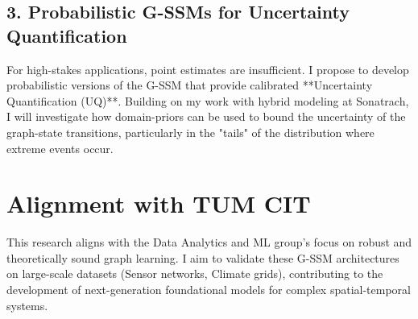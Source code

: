 \documentclass[11pt,a4paper]{article}
\begin{document}
\subsection{3. Probabilistic G-SSMs for Uncertainty Quantification}
For high-stakes applications, point estimates are insufficient. I propose to develop probabilistic versions of the G-SSM that provide calibrated **Uncertainty Quantification (UQ)**. Building on my work with hybrid modeling at Sonatrach, I will investigate how domain-priors can be used to bound the uncertainty of the graph-state transitions, particularly in the "tails" of the distribution where extreme events occur.

\section{Alignment with TUM CIT}
This research aligns with the Data Analytics and ML group's focus on robust and theoretically sound graph learning. I aim to validate these G-SSM architectures on large-scale datasets (Sensor networks, Climate grids), contributing to the development of next-generation foundational models for complex spatial-temporal systems.
\end{document}
